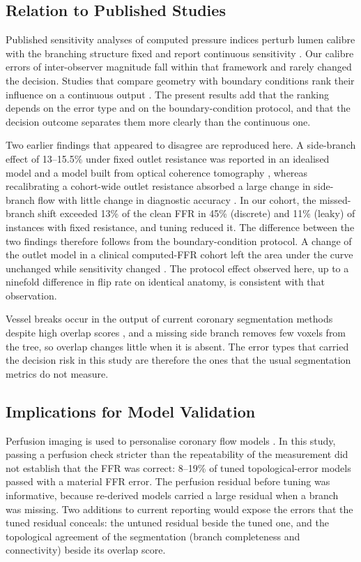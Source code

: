 \documentclass[journal]{IEEEtran}
\begin{document}
\subsection{Relation to Published Studies}
Published sensitivity analyses of computed pressure indices perturb lumen calibre with the branching structure fixed and report
continuous sensitivity \cite{sankaran2015tmi,sankaran2015cmame,fernandez2024,dalmaso2025}. Our calibre errors of
inter-observer magnitude fall within that framework and rarely changed the decision. Studies that compare geometry with boundary conditions rank their influence on a continuous output
\cite{sankaran2016,tanade2022,korte2023}. The present results add that the ranking depends on the error type and on
the boundary-condition protocol, and that the decision outcome separates them more clearly than the continuous
one.

Two earlier findings that appeared to disagree are reproduced here. A side-branch effect of 13--15.5\% under fixed outlet resistance was reported in an idealised model and a model built from optical coherence tomography \cite{gamage2022}, whereas recalibrating a cohort-wide outlet resistance absorbed a large change in side-branch flow with little change in diagnostic accuracy \cite{gosling2020}. In our cohort, the missed-branch shift exceeded 13\% of the clean FFR in 45\%
(discrete) and 11\% (leaky) of instances with fixed resistance, and tuning reduced it. The difference between the
two findings therefore follows from the boundary-condition protocol. A change of
the outlet model in a clinical computed-FFR cohort left the area under the curve unchanged while sensitivity
changed \cite{fossan2026}. The protocol effect observed here, up to a ninefold difference in flip rate on identical
anatomy, is consistent with that observation.

Vessel breaks occur in the output of current coronary segmentation methods despite high overlap scores \cite{bransby2026}, and a missing side branch removes few voxels from the tree, so overlap changes little when it is absent. The error types that carried the decision risk
in this study are therefore the ones that the usual segmentation metrics do not measure.

\subsection{Implications for Model Validation}
Perfusion imaging is used to personalise coronary flow models \cite{menon2024}. In this study, passing a
perfusion check stricter than the repeatability of the measurement did not establish that the FFR was correct:
8--19\% of tuned topological-error models passed with a material FFR error. The perfusion residual before tuning
was informative, because re-derived models carried a large residual when a branch was missing. Two additions to
current reporting would expose the errors that the tuned residual conceals: the untuned residual beside the tuned
one, and the topological agreement of the segmentation (branch completeness and connectivity) beside its overlap
score.
\end{document}
